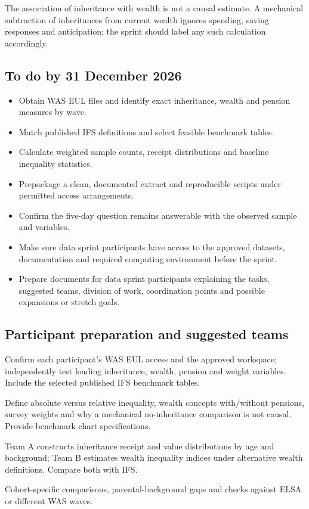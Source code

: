 The association of inheritance with wealth is not a causal estimate. A mechanical subtraction of inheritances from current wealth ignores spending, saving responses and anticipation; the sprint should label any such calculation accordingly.

\subsection{To do by 31 December 2026}
\begin{itemize}[nosep]
\item Obtain WAS EUL files and identify exact inheritance, wealth and pension measures by wave.
\item Match published IFS definitions and select feasible benchmark tables.
\item Calculate weighted sample counts, receipt distributions and baseline inequality statistics.
\item Prepackage a clean, documented extract and reproducible scripts under permitted access arrangements.
\item Confirm the five-day question remains answerable with the observed sample and variables.
\item Make sure data sprint participants have access to the approved datasets, documentation and required computing environment before the sprint.
\item Prepare documents for data sprint participants explaining the tasks, suggested teams, division of work, coordination points and possible expansions or stretch goals.
\end{itemize}

\subsection{Participant preparation and suggested teams}
\begin{description}[style=nextline]
\item[Access preflight] Confirm each participant's WAS EUL access and the approved workspace; independently test loading inheritance, wealth, pension and weight variables. Include the selected published IFS benchmark tables.
\item[Participant brief] Define absolute versus relative inequality, wealth concepts with/without pensions, survey weights and why a mechanical no-inheritance comparison is not causal. Provide benchmark chart specifications.
\item[Suggested teams] Team A constructs inheritance receipt and value distributions by age and background; Team B estimates wealth inequality indices under alternative wealth definitions. Compare both with IFS.
\item[Stretch goals] Cohort-specific comparisons, parental-background gaps and checks against ELSA or different WAS waves.
\end{description}

